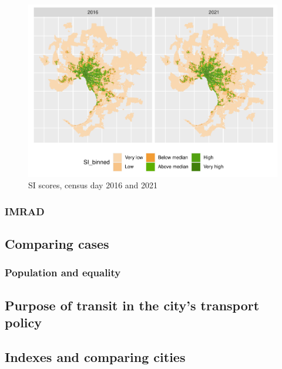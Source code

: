 \documentclass[preprint, 3p,
authoryear]{elsarticle} %
\begin{document}
\begin{figure}
\centering
\includegraphics{Leveraging_GTFS_to_assess_transit_supply_Transport_Geography_files/figure-latex/Greater_Melbourne_2016_2021-1.pdf}
\caption{SI scores, census day 2016 and 2021}
\end{figure}

\hypertarget{imrad}{%
\subsubsection{IMRAD}\label{imrad}}

\hypertarget{comparing-cases}{%
\subsection{Comparing cases}\label{comparing-cases}}

\hypertarget{population-and-equality}{%
\subsubsection{Population and equality}\label{population-and-equality}}

\hypertarget{purpose-of-transit-in-the-citys-transport-policy}{%
\subsection{Purpose of transit in the city's transport
policy}\label{purpose-of-transit-in-the-citys-transport-policy}}

\hypertarget{indexes-and-comparing-cities}{%
\subsection{Indexes and comparing
cities}\label{indexes-and-comparing-cities}}
\end{document}
